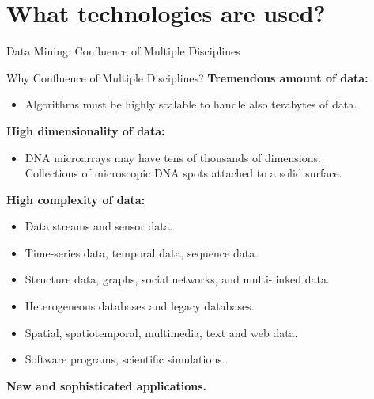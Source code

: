 \section{What technologies are used?}

\begin{frame}{Data Mining: Confluence of Multiple Disciplines}
	\centering
\end{frame}

\begin{frame}{Why Confluence of Multiple Disciplines?}
	\textbf{Tremendous amount of data:}
	\begin{itemize}
		\item Algorithms must be highly scalable to handle also terabytes of
		      data.
	\end{itemize}

	\textbf{High dimensionality of data:}
	\begin{itemize}
		\item DNA microarrays may have tens of thousands of dimensions.\\
		      Collections of microscopic DNA spots attached to a solid surface.
	\end{itemize}

	\textbf{High complexity of data:}
	\begin{itemize}
		\item Data streams and sensor data.
		\item Time-series data, temporal data, sequence data.
		\item Structure data, graphs, social networks, and multi-linked data.
		\item Heterogeneous databases and legacy databases.
		\item Spatial, spatiotemporal, multimedia, text and web data.
		\item Software programs, scientific simulations.
	\end{itemize}
	\textbf{New and sophisticated applications.}
\end{frame}
